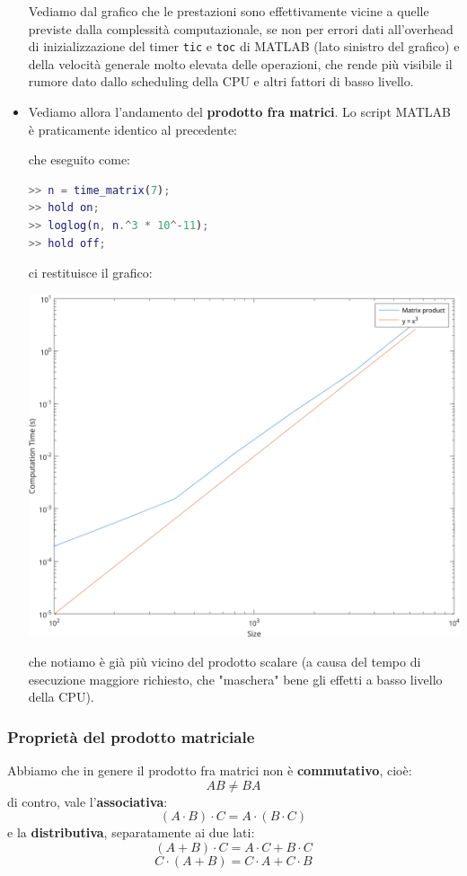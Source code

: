 \documentclass[a4paper,11pt]{article}
\begin{document}
\begin{itemize}
Vediamo dal grafico che le prestazioni sono effettivamente vicine a quelle previste dalla complessità computazionale, se non per errori dati all'overhead di inizializzazione del timer \lstinline|tic| e \lstinline|toc| di MATLAB (lato sinistro del grafico) e della velocità generale molto elevata delle operazioni, che rende più visibile il rumore dato dallo scheduling della CPU e altri fattori di basso livello.

\item Vediamo allora l'andamento del \textbf{prodotto fra matrici}. Lo script MATLAB è praticamente identico al precedente:

che eseguito come:
\begin{lstlisting}[language=MATLAB, style=codestyle]	
>> n = time_matrix(7);
>> hold on;
>> loglog(n, n.^3 * 10^-11);
>> hold off;
\end{lstlisting}
ci restituisce il grafico:
\begin{center}
	\includegraphics[scale=0.6]{../figures/matrix_perf.png}
\end{center}
che notiamo è già più vicino del prodotto scalare (a causa del tempo di esecuzione maggiore richiesto, che "maschera" bene gli effetti a basso livello della CPU). 

\end{itemize}

\subsubsection{Proprietà del prodotto matriciale}
Abbiamo che in genere il prodotto fra matrici non è \textbf{commutativo}, cioè:
$$
A B \neq BA
$$
di contro, vale l'\textbf{associativa}:
$$
(A \cdot B) \cdot C = A \cdot (B\cdot C)
$$
e la \textbf{distributiva}, separatamente ai due lati:
$$
(A + B) \cdot C = A \cdot C + B \cdot C
$$
$$
C \cdot (A + B) = C \cdot A + C \cdot B 
$$
\end{document}
